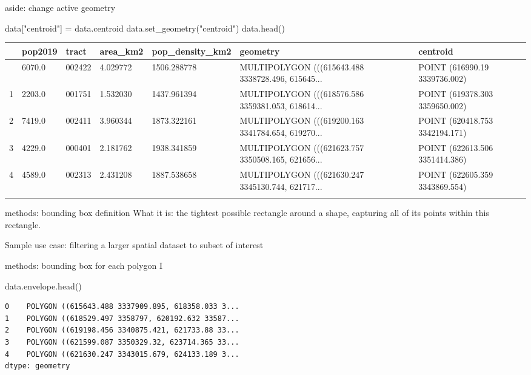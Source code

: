 \documentclass[
  ignorenonframetext,
]{beamer}
\newenvironment{Shaded}{\begin{snugshade}}{\end{snugshade}}
\newcommand{\NormalTok}[1]{\textcolor[rgb]{0.00,0.23,0.31}{#1}}
\newcommand{\OperatorTok}[1]{\textcolor[rgb]{0.37,0.37,0.37}{#1}}
\newcommand{\StringTok}[1]{\textcolor[rgb]{0.13,0.47,0.30}{#1}}
\begin{document}
\begin{frame}[fragile]{aside: change active geometry}
\label{aside-change-active-geometry}
\begin{Shaded}
\begin{Highlighting}[]
\NormalTok{data[}\StringTok{"centroid"}\NormalTok{] }\OperatorTok{=}\NormalTok{ data.centroid}
\NormalTok{data.set\_geometry(}\StringTok{"centroid"}\NormalTok{)}
\NormalTok{data.head()}
\end{Highlighting}
\end{Shaded}

\begin{longtable}[]{@{}lllllll@{}}
\toprule\noalign{}
& pop2019 & tract & area\_km2 & pop\_density\_km2 & geometry &
centroid \\
\midrule\noalign{}
\endhead
0 & 6070.0 & 002422 & 4.029772 & 1506.288778 & MULTIPOLYGON
(((615643.488 3338728.496, 615645... & POINT (616990.19 3339736.002) \\
1 & 2203.0 & 001751 & 1.532030 & 1437.961394 & MULTIPOLYGON
(((618576.586 3359381.053, 618614... & POINT (619378.303 3359650.002) \\
2 & 7419.0 & 002411 & 3.960344 & 1873.322161 & MULTIPOLYGON
(((619200.163 3341784.654, 619270... & POINT (620418.753 3342194.171) \\
3 & 4229.0 & 000401 & 2.181762 & 1938.341859 & MULTIPOLYGON
(((621623.757 3350508.165, 621656... & POINT (622613.506 3351414.386) \\
4 & 4589.0 & 002313 & 2.431208 & 1887.538658 & MULTIPOLYGON
(((621630.247 3345130.744, 621717... & POINT (622605.359 3343869.554) \\
\bottomrule\noalign{}
\end{longtable}
\end{frame}

\begin{frame}{methods: bounding box definition}
\label{methods-bounding-box-definition}
What it is: the tightest possible rectangle around a shape, capturing
all of its points within this rectangle.

Sample use case: filtering a larger spatial dataset to subset of
interest
\end{frame}

\begin{frame}[fragile]{methods: bounding box for each polygon I}
\label{methods-bounding-box-for-each-polygon-i}
\begin{Shaded}
\begin{Highlighting}[]
\NormalTok{data.envelope.head()}
\end{Highlighting}
\end{Shaded}

\begin{verbatim}
0    POLYGON ((615643.488 3337909.895, 618358.033 3...
1    POLYGON ((618529.497 3358797, 620192.632 33587...
2    POLYGON ((619198.456 3340875.421, 621733.88 33...
3    POLYGON ((621599.087 3350329.32, 623714.365 33...
4    POLYGON ((621630.247 3343015.679, 624133.189 3...
dtype: geometry
\end{verbatim}
\end{frame}
\end{document}
